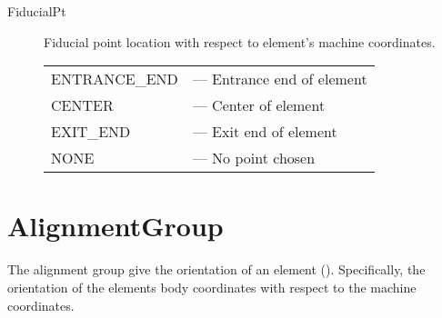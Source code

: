 \begin{description}
\begin{tabular}{ll}
\end{tabular}
%
\item[FiducialPt] Fiducial point location with respect to element's machine coordinates. \Newline
\hspace*{-20pt}
\begin{tabular}{ll}
  ENTRANCE_END & --- Entrance end of element \\
  CENTER       & --- Center of element \\
  EXIT_END     & --- Exit end of element \\
  NONE         & --- No point chosen \\
\end{tabular}
%
\end{description}

\section{AlignmentGroup}
\label{s:align.g}

The alignment group give the orientation of an element (). Specifically, the
orientation of the elements body coordinates with respect to the machine coordinates.